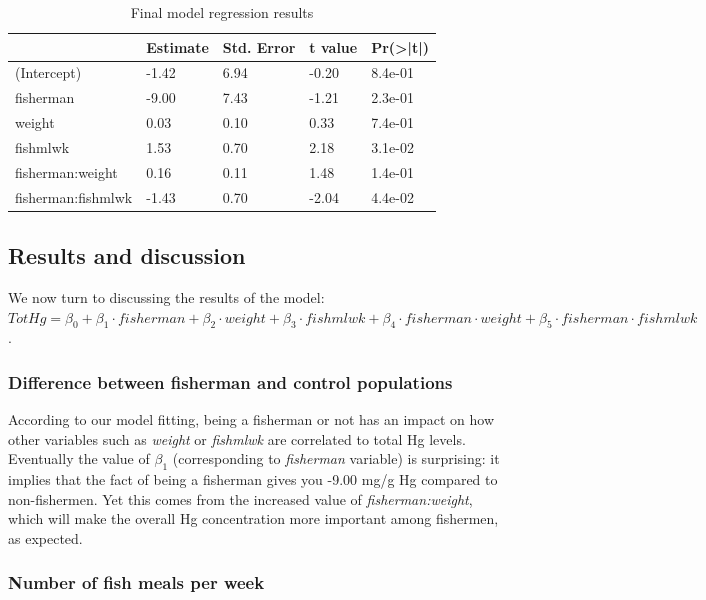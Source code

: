 \documentclass[12pt,]{article}
\begin{document}
\begin{table}[t]

\caption{\label{tab:unnamed-chunk-14}\label{tbl:interactionmodel}Final model regression results}
\centering
\begin{tabular}{l|l|l|l|l}
\hline
  & Estimate & Std. Error & t value & Pr(>|t|)\\
\hline
\rowcolor{gray!6}  (Intercept) & -1.42 & 6.94 & -0.20 & 8.4e-01\\
\hline
fisherman & -9.00 & 7.43 & -1.21 & 2.3e-01\\
\hline
\rowcolor{gray!6}  weight & 0.03 & 0.10 & 0.33 & 7.4e-01\\
\hline
fishmlwk & 1.53 & 0.70 & 2.18 & 3.1e-02\\
\hline
\rowcolor{gray!6}  fisherman:weight & 0.16 & 0.11 & 1.48 & 1.4e-01\\
\hline
fisherman:fishmlwk & -1.43 & 0.70 & -2.04 & 4.4e-02\\
\hline
\end{tabular}
\end{table}

\subsection{Results and discussion}\label{results-and-discussion}

We now turn to discussing the results of the model:
\(TotHg = \beta_0 + \beta_1 \cdot fisherman + \beta_2 \cdot weight + \beta_3 \cdot fishmlwk + \beta_4 \cdot fisherman \cdot weight + \beta_5 \cdot fisherman \cdot fishmlwk\).

\subsubsection{Difference between fisherman and control
populations}\label{difference-between-fisherman-and-control-populations}

According to our model fitting, being a fisherman or not has an impact
on how other variables such as \emph{weight} or \emph{fishmlwk} are
correlated to total Hg levels. Eventually the value of \(\beta_1\)
(corresponding to \emph{fisherman} variable) is surprising: it implies
that the fact of being a fisherman gives you -9.00 mg/g Hg compared to
non-fishermen. Yet this comes from the increased value of
\emph{fisherman:weight}, which will make the overall Hg concentration
more important among fishermen, as expected.

\subsubsection{Number of fish meals per
week}\label{number-of-fish-meals-per-week}
\end{document}
